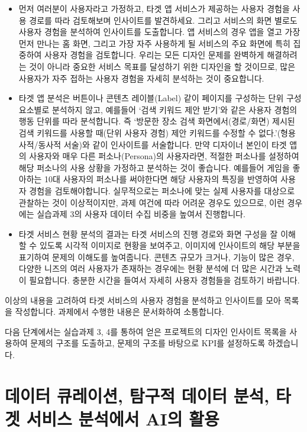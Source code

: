 \documentclass[
  letterpaper,
]{book}
\providecommand{\tightlist}{%
  \setlength{\itemsep}{0pt}\setlength{\parskip}{0pt}}\usepackage{longtable,booktabs,array}
\begin{document}
\begin{itemize}
\tightlist
\item
  먼저 여러분이 사용자라고 가정하고, 타겟 앱 서비스가 제공하는 사용자
  경험을 사용 경로를 따라 검토해보며 인사이트를 발견하세요. 그리고
  서비스의 화면 별로도 사용자 경험을 분석하여 인사이트를 도출합니다. 앱
  서비스의 경우 앱을 열고 가장 먼저 만나는 홈 화면, 그리고 가장 자주
  사용하게 될 서비스의 주요 화면에 특히 집중하여 사용자 경험을
  검토합니다. 우리는 모든 디자인 문제를 완벽하게 해결하려는 것이 아니라
  중요한 서비스 목표를 달성하기 위한 디자인을 할 것이므로, 많은 사용자가
  자주 접하는 사용자 경험을 자세히 분석하는 것이 중요합니다.
\item
  타겟 앱 분석은 버튼이나 콘텐츠 레이블(Label) 같이 페이지를 구성하는
  단위 구성요소별로 분석하지 않고, 예를들어 `검색 키워드 제안 받기'와
  같은 사용자 경험의 행동 단위를 따라 분석합니다. 즉 `방문한 장소 검색
  화면에서(경로/화면) 제시된 검색 키워드를 사용할 때(단위 사용자 경험)
  제안 키워드를 수정할 수 없다.'(형용사적/동사적 서술)와 같이 인사이트를
  서술합니다. 만약 디자이너 본인이 타겟 앱의 사용자와 매우 다른
  퍼소나(Persona)의 사용자라면, 적절한 퍼소나를 설정하여 해당 퍼소나의
  사용 상황을 가정하고 분석하는 것이 좋습니다. 예를들어 게임을 좋아하는
  10대 사용자의 퍼소나를 써야한다면 해당 사용자의 특징을 반영하여 사용자
  경험을 검토해야합니다. 실무적으로는 퍼소나에 맞는 실제 사용자를
  대상으로 관찰하는 것이 이상적이지만, 과제 여건에 따라 어려운 경우도
  있으므로, 이런 경우에는 실습과제 3의 사용자 데이터 수집 비중을 높여서
  진행합니다.
\item
  타겟 서비스 현황 분석의 결과는 타겟 서비스의 진행 경로와 화면 구성을
  잘 이해할 수 있도록 시각적 이미지로 현황을 보여주고, 이미지에
  인사이트의 해당 부분을 표기하여 문제의 이해도를 높여줍니다. 콘텐츠
  규모가 크거나, 기능이 많은 경우, 다양한 니즈의 여러 사용자가 존재하는
  경우에는 현황 분석에 더 많은 시간과 노력이 필요합니다. 충분한 시간을
  들여서 자세히 사용자 경험들을 검토하기 바랍니다.
\end{itemize}

이상의 내용을 고려하여 타겟 서비스의 사용자 경험을 분석하고 인사이트를
모아 목록을 작성합니다. 과제에서 수행한 내용은 문서화하여 소통합니다.

다음 단계에서는 실습과제 3, 4를 통하여 얻은 프로젝트의 디자인 인사이트
목록을 사용하여 문제의 구조를 도출하고, 문제의 구조를 바탕으로 KPI를
설정하도록 하겠습니다.

\section{데이터 큐레이션, 탐구적 데이터 분석, 타겟 서비스 분석에서 AI의
활용}\label{uxb370uxc774uxd130-uxd050uxb808uxc774uxc158-uxd0d0uxad6cuxc801-uxb370uxc774uxd130-uxbd84uxc11d-uxd0c0uxac9f-uxc11cuxbe44uxc2a4-uxbd84uxc11duxc5d0uxc11c-aiuxc758-uxd65cuxc6a9}
\end{document}
